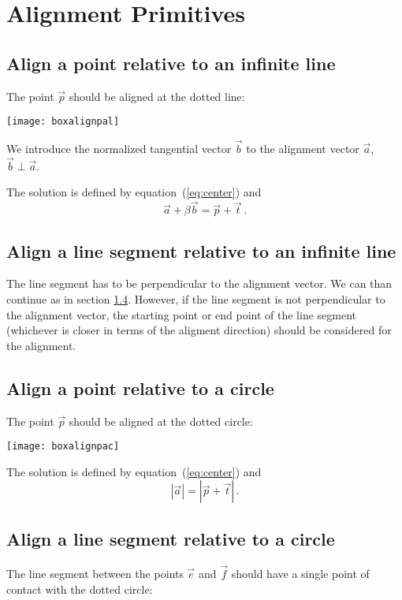 \documentclass{article}
\begin{document}
\pagebreak
\section{Alignment Primitives}
\subsection{Align a point relative to an infinite line}
The point $\vec p$ should be aligned at the dotted line:

\centerline{\texttt{[image: boxalignpal]}}

We introduce the normalized tangential vector $\vec b$ to the
alignment vector $\vec a$, $\vec b\perp\vec a$.

The solution is defined by equation~(\ref{eq:center}) and
\begin{equation}
\vec a+\beta\vec b=\vec p+\vec t\,.
\end{equation}

\subsection{Align a line segment relative to an infinite line}
The line segment has to be perpendicular to the alignment vector.
We can than continue as in section \ref{s:calignline}. However, if the
line segment is not perpendicular to the alignment vector, the
starting point or end point of the line segment (whichever is closer
in terms of the aligment direction) should be considered for the
alignment.

\subsection{Align a point relative to a circle}
The point $\vec p$ should be aligned at the dotted circle:

\centerline{\texttt{[image: boxalignpac]}}

The solution is defined by equation~(\ref{eq:center}) and
\begin{equation}
|\vec a|=|\vec p+\vec t|\,.
\end{equation}

\subsection{Align a line segment relative to a circle}
\label{s:calignline}
The line segment between the points $\vec e$ and $\vec f$ should have
a single point of contact with the dotted circle:
\end{document}
